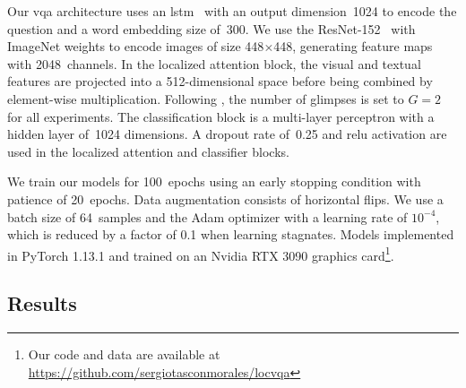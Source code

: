 Our \gls{vqa} architecture uses an \gls{lstm}~\cite{hochreiter1997long} with an output dimension~1024 to encode the question and a word embedding size of~300.
We use the ResNet-152~\cite{he2016deep} with ImageNet weights to encode images of size 448$\times$448, generating feature maps with 2048~channels.
In the localized attention block, the visual and textual features are projected into a 512-dimensional space before being combined by element-wise multiplication. Following \cite{fukui2016multimodal,kim2016hadamard}, the number of glimpses is set to $G=2$ for all experiments.
The classification block is a multi-layer perceptron with a hidden layer of~1024 dimensions. A dropout rate of~0.25 and \gls{relu} activation are used in the localized attention and classifier blocks.

We train our models for 100~epochs using an early stopping condition with patience of 20~epochs. Data augmentation consists of horizontal flips. We use a batch size of 64~samples and the Adam optimizer with a learning rate of $10^{-4}$, which is reduced by a factor of 0.1 when learning stagnates.
Models implemented in PyTorch 1.13.1 and trained on an Nvidia RTX 3090 graphics card\footnote{Our code and data are available at \url{https://github.com/sergiotasconmorales/locvqa}}. 


\subsection{Results} 

\label{sec:locvqa_results}



